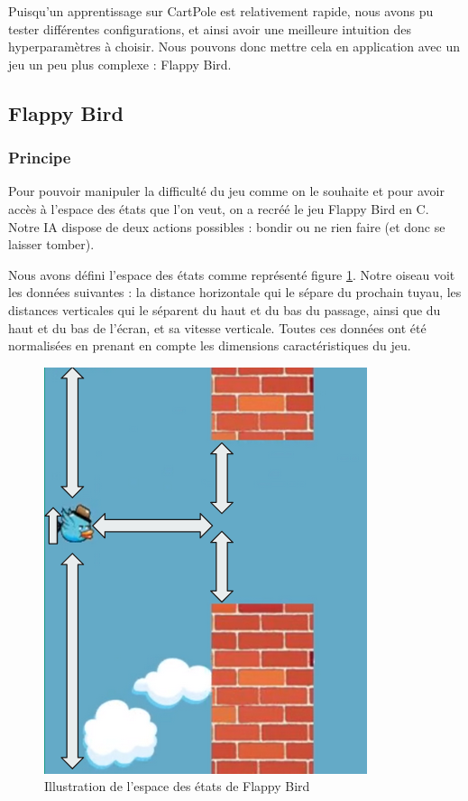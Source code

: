 Puisqu'un apprentissage sur CartPole est relativement rapide, nous avons pu tester différentes configurations, et ainsi avoir une meilleure intuition des hyperparamètres
à choisir. Nous pouvons donc mettre cela en application avec un jeu un peu plus complexe : Flappy Bird.


\subsection{Flappy Bird}

\subsubsection{Principe}

Pour pouvoir manipuler la difficulté du jeu comme on le souhaite et pour avoir accès à l'espace des états que l'on veut, on a recréé le jeu Flappy Bird en C.
Notre IA dispose de deux actions possibles : bondir ou ne rien faire (et donc se laisser tomber).

Nous avons défini l'espace des états comme représenté figure \ref{fig:flappy-states}. Notre oiseau voit les données suivantes : la distance horizontale qui le sépare 
du prochain tuyau, les distances verticales qui le séparent du haut et du bas du passage, ainsi que du haut et du bas de l'écran, et sa vitesse verticale.
Toutes ces données ont été normalisées en prenant en compte les dimensions caractéristiques du jeu. 

\begin{figure}[h]
 \centering
 \includegraphics[scale = 0.3]{img/flappy_state.png}
 \caption{Illustration de l'espace des états de Flappy Bird}
 \label{fig:flappy-states}
\end{figure}

